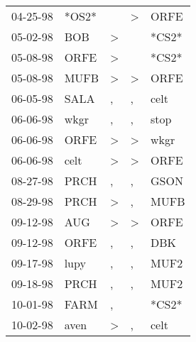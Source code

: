 \begin{supertabular}{p{0.07\textwidth}p{0.06\textwidth}p{0.02\textwidth}p{0.02\textwidth}p{0.06\textwidth}}
          04-25-98\textsuperscript{} &                   *OS2* &               &  \textgreater &  ORFE\textsuperscript{} \\
          05-02-98\textsuperscript{} &   BOB\textsuperscript{} &  \textgreater &               &                   *CS2* \\
          05-08-98\textsuperscript{} &  ORFE\textsuperscript{} &  \textgreater &               &                   *CS2* \\
          05-08-98\textsuperscript{} &  MUFB\textsuperscript{} &  \textgreater &  \textgreater &  ORFE\textsuperscript{} \\
          06-05-98\textsuperscript{} &  SALA\textsuperscript{} &             , &             , &  celt\textsuperscript{} \\
          06-06-98\textsuperscript{} &  wkgr\textsuperscript{} &             , &             , &  stop\textsuperscript{} \\
          06-06-98\textsuperscript{} &  ORFE\textsuperscript{} &  \textgreater &  \textgreater &  wkgr\textsuperscript{} \\
          06-06-98\textsuperscript{} &  celt\textsuperscript{} &  \textgreater &  \textgreater &  ORFE\textsuperscript{} \\
          08-27-98\textsuperscript{} &  PRCH\textsuperscript{} &             , &             , &  GSON\textsuperscript{} \\
          08-29-98\textsuperscript{} &  PRCH\textsuperscript{} &  \textgreater &             , &  MUFB\textsuperscript{} \\
          09-12-98\textsuperscript{} &   AUG\textsuperscript{} &  \textgreater &  \textgreater &  ORFE\textsuperscript{} \\
          09-12-98\textsuperscript{} &  ORFE\textsuperscript{} &             , &             , &   DBK\textsuperscript{} \\
          09-17-98\textsuperscript{} &  lupy\textsuperscript{} &             , &             , &  MUF2\textsuperscript{} \\
          09-18-98\textsuperscript{} &  PRCH\textsuperscript{} &             , &             , &  MUF2\textsuperscript{} \\
          10-01-98\textsuperscript{} &  FARM\textsuperscript{} &             , &               &                   *CS2* \\
          10-02-98\textsuperscript{} &  aven\textsuperscript{} &  \textgreater &             , &  celt\textsuperscript{} \\

\end{supertabular}
